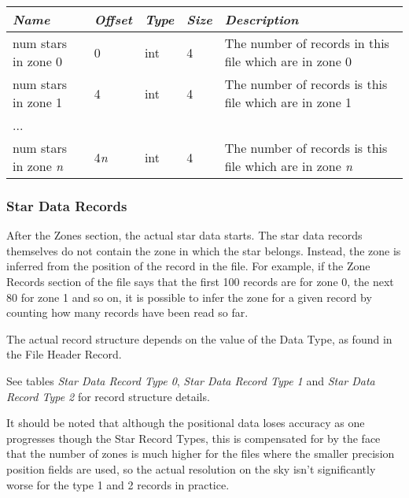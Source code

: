 \begin{longtabu} to \textwidth {l l l l X}
\toprule
\emph{Name} & \emph{Offset} & \emph{Type} & \emph{Size} &
\emph{Description}\tabularnewline
\midrule
num stars in zone 0 & 0 & int & 4 & The number of records in this file
which are in zone 0\tabularnewline
\midrule
num stars in zone 1 & 4 & int & 4 & The number of records is this file
which are in zone 1\tabularnewline
... & & & &\tabularnewline
num stars in zone \emph{n} & 4\emph{n} & int & 4 & The number of records
is this file which are in zone \emph{n}\tabularnewline
\bottomrule
\end{longtabu}

\subsubsection{Star Data Records}\label{star-data-records}

After the Zones section, the actual star data starts. The star data
records themselves do not contain the zone in which the star belongs.
Instead, the zone is inferred from the position of the record in the
file. For example, if the Zone Records section of the file says that the
first 100 records are for zone 0, the next 80 for zone 1 and so on, it
is possible to infer the zone for a given record by counting how many
records have been read so far.

The actual record structure depends on the value of the Data Type, as
found in the File Header Record.

See tables \emph{Star Data Record Type 0}, \emph{Star Data Record Type
1} and \emph{Star Data Record Type 2} for record structure details.

It should be noted that although the positional data loses accuracy as
one progresses though the Star Record Types, this is compensated for by
the face that the number of zones is much higher for the files where the
smaller precision position fields are used, so the actual resolution on
the sky isn't significantly worse for the type 1 and 2 records in
practice.

